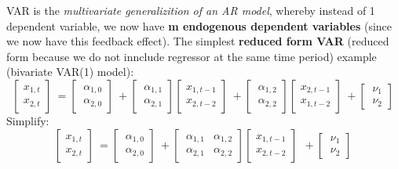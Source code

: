 \documentclass[12pt]{article}
\begin{document}
VAR is the \textit{multivariate generalizition of an AR model}, whereby instead of 1 dependent variable, we now have \textbf{m endogenous dependent variables} (since we now have this feedback effect). The simplest \textbf{reduced form VAR} (reduced form because we do not innclude regressor at the same time period) example (bivariate VAR(1) model):\\
\begin{equation}
\left[\begin{matrix}x_{1,t}\\x_{2,t}\end{matrix}\right]\ =\left[\ \begin{matrix}\alpha_{1,0}\\\alpha_{2,0}\end{matrix}\right]\ +\left[\ \begin{matrix}\alpha_{1,1}\\\alpha_{2,1}\end{matrix}\right]\left[\begin{matrix}x_{1,t-1}\\x_{2,t-2}\end{matrix}\right]\ +\left[\ \begin{matrix}\alpha_{1,2}\\\alpha_{2,2}\end{matrix}\right]\left[\begin{matrix}x_{2,t-1}\\x_{1,t-2}\end{matrix}\right]\ +\left[\ \begin{matrix}\nu_1\\\nu_2\end{matrix}\right]\ 
\end{equation}
Simplify:
\begin{equation}
\left[\begin{matrix}x_{1,t}\\x_{2,t}\end{matrix}\right]\ =\left[\ \begin{matrix}\alpha_{1,0}\\\alpha_{2,0}\end{matrix}\right]\ +\left[\ \begin{matrix}\alpha_{1,1}&\alpha_{1,2}\\\alpha_{2,1}&\alpha_{2,2}\end{matrix}\right]\left[\begin{matrix}x_{1,t-1}\\x_{2,t-2}\end{matrix}\right]\ \ +\left[\ \begin{matrix}\nu_1\\\nu_2\end{matrix}\right]\ 
\end{equation}
\end{document}
